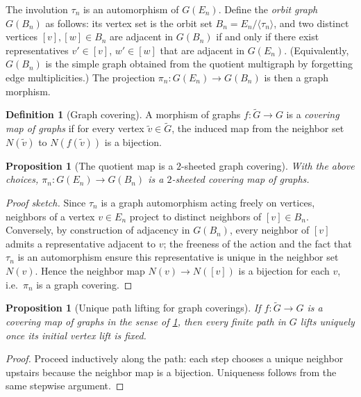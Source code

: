 \documentclass[11pt,a4paper]{article}
\newtheorem{proposition}[theorem]{Proposition}
\theoremstyle{definition}
\newtheorem{definition}[theorem]{Definition}
\theoremstyle{remark}
\begin{document}
The involution \(\tau_n\) is an automorphism of \(G(E_n)\). Define the \emph{orbit graph} \(G(B_n)\) as follows: its vertex set is the orbit set \(B_n=E_n/\langle\tau_n\rangle\), and two distinct vertices \([v],[w]\in B_n\) are adjacent in \(G(B_n)\) if and only if there exist representatives \(v'\in[v]\), \(w'\in[w]\) that are adjacent in \(G(E_n)\). (Equivalently, \(G(B_n)\) is the simple graph obtained from the quotient multigraph by forgetting edge multiplicities.) The projection \(\pi_n:G(E_n)\to G(B_n)\) is then a graph morphism.

\begin{definition}[Graph covering]
\label{def:graph-cover}
A morphism of graphs \(f:\widetilde G\to G\) is a \emph{covering map of graphs} if for every vertex \(\tilde v\in \widetilde G\), the induced map from the neighbor set \(N(\tilde v)\) to \(N(f(\tilde v))\) is a bijection.
\end{definition}

\begin{proposition}[The quotient map is a \(2\)-sheeted graph covering]
\label{prop:graph-covering}
With the above choices, \(\pi_n:G(E_n)\to G(B_n)\) is a \(2\)-sheeted covering map of graphs.
\end{proposition}

\begin{proof}[Proof sketch]
Since \(\tau_n\) is a graph automorphism acting freely on vertices, neighbors of a vertex \(v\in E_n\) project to distinct neighbors of \([v]\in B_n\). Conversely, by construction of adjacency in \(G(B_n)\), every neighbor of \([v]\) admits a representative adjacent to \(v\); the freeness of the action and the fact that \(\tau_n\) is an automorphism ensure this representative is unique in the neighbor set \(N(v)\). Hence the neighbor map \(N(v)\to N([v])\) is a bijection for each \(v\), i.e.\ \(\pi_n\) is a graph covering.
\end{proof}

\begin{proposition}[Unique path lifting for graph coverings]
\label{prop:graph-upl}
If \(f:\widetilde G\to G\) is a covering map of graphs in the sense of \cref{def:graph-cover}, then every finite path in \(G\) lifts uniquely once its initial vertex lift is fixed.
\end{proposition}

\begin{proof}
Proceed inductively along the path: each step chooses a unique neighbor upstairs because the neighbor map is a bijection. Uniqueness follows from the same stepwise argument.
\end{proof}
\end{document}
